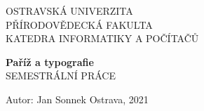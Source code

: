 
\begin{titlepage}
\begin{center}

\Large{OSTRAVSKÁ UNIVERZITA} \\
\Large{PŘÍRODOVĚDECKÁ FAKULTA}\\
\Large{KATEDRA INFORMATIKY A POČÍTAČŮ}
\vspace{8cm}

\huge{\textbf{Paříž a typografie}}\\
\vspace{1cm}
\Large{SEMESTRÁLNÍ PRÁCE}

\vspace{7cm}

\end{center}

\normalsize{Autor: Jan Sonnek \hfill Ostrava, 2021}

\end{titlepage}

